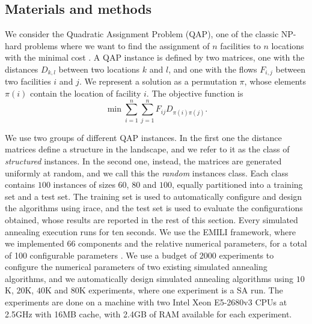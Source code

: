 \subsection{Materials and methods}\label{sec:material}
We consider the Quadratic Assignment Problem (QAP), one of the classic NP-hard
problems where we want to find the assignment of $n$ facilities to $n$ locations
with the minimal cost \cite{KooBec57}. A QAP instance is defined by two
matrices, one with the distances $D_{k,l}$ between two locations $k$ and $l$, and
one with the flows $F_{i,j}$ between two facilities $i$ and $j$.
We represent a solution as a permutation $\pi$, whose
elements $\pi(i)$ contain the location of facility $i$. The objective function is
\begin{equation}
  \min\sum_{i=1}^n\sum_{j=1}^n F_{ij} D_{{\pi(i)}{\pi(j)}}.
\end{equation}

We use two groups of different QAP instances. In the first one the distance matrices 
define a structure in the landscape, and we refer to it as the class of \textit{structured} instances. 
In the second one, instead, the matrices are generated
uniformly at random, and we call this the \textit{random} instances class.
Each class
contains $100$ instances of sizes $60$, $80$ and $100$, equally partitioned into
a training set and a test set.
The training set is used to automatically configure 
and design the algorithms using irace, and the test set is used to 
evaluate the configurations obtained, whose results are reported
in the rest of this section.
Every simulated annealing execution runs for ten seconds.
We use the EMILI framework,
where we implemented 66 components and the relative numerical parameters,
for a total of 100 configurable parameters \cite{PagStu2019:ejor}.
We use a budget of $2000$ experiments to configure the numerical parameters
of two existing simulated annealing algorithms, and we automatically design simulated annealing algorithms
using $10$K, $20$K, $40$K and $80$K experiments, where one experiment is a SA run.
The experiments are done on a machine with two Intel Xeon E5-2680v3 CPUs 
at 2.5GHz with 16MB cache, with 2.4GB of RAM available for each experiment.


